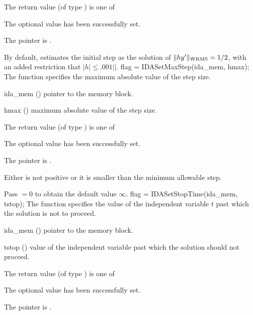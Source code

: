{
  The return value  (of type ) is one of
  \begin{args}
  \item[\Id{IDA\_SUCCESS}] 
    The optional value has been successfully set.
  \item[\Id{IDA\_MEM\_NULL}]
    The  pointer is .
  \end{args}
}
{
  By default, {\ida} estimates the initial step as the solution of 
  $\|h y' \|_{\mbox{\scriptsize WRMS}} = 1/2$, with an added restriction
  that $|h| \leq .001|$$|$.
}
{
flag = IDASetMaxStep(ida\_mem, hmax);
}
{
  The function  specifies the maximum absolute
  value of the step size.
}
{
  \begin{args}
  \item[ida\_mem] ()
    pointer to the {\ida} memory block.
  \item[hmax] ()
    maximum absolute value of the step size.
  \end{args}
}
{
  The return value  (of type ) is one of
  \begin{args}
  \item[\Id{IDA\_SUCCESS}] 
    The optional value has been successfully set.
  \item[\Id{IDA\_MEM\_NULL}]
    The  pointer is .
  \item[\Id{IDA\_ILL\_INPUT}]
    Either  is not positive or it is smaller than the minimum allowable step.
  \end{args}
}
{
  Pass $=0$ to obtain the default value $\infty$.
}
{
flag = IDASetStopTime(ida\_mem, tstop);
}
{
  The function  specifies the value of the
  independent variable $t$ past which the solution is not to proceed.
}
{
  \begin{args}
  \item[ida\_mem] ()
    pointer to the {\ida} memory block.
  \item[tstop] ()
    value of the independent variable past which the solution should
    not proceed.
  \end{args}
}
{
  The return value  (of type ) is one of
  \begin{args}
  \item[\Id{IDA\_SUCCESS}] 
    The optional value has been successfully set.
  \item[\Id{IDA\_MEM\_NULL}]
    The  pointer is .
  \end{args}
}
